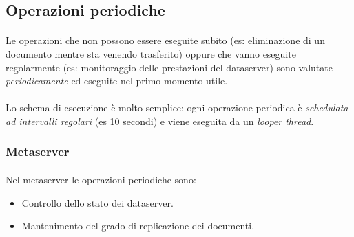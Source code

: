 \documentclass[11pt,a4paper,english]{article}
\begin{document}
\subsection{Operazioni periodiche}

\paragraph{} Le operazioni che non possono essere eseguite subito (es: eliminazione di un documento mentre sta venendo trasferito) oppure che vanno eseguite regolarmente (es: monitoraggio delle prestazioni del dataserver) sono valutate \emph{periodicamente} ed eseguite nel primo momento utile. 

\paragraph{} Lo schema di esecuzione è molto semplice: ogni operazione periodica è \emph{schedulata ad intervalli regolari} (es 10 secondi) e viene eseguita da un \emph{looper thread}.

\subsubsection{Metaserver}

\paragraph{} Nel metaserver le operazioni periodiche sono:\begin{itemize}
	\item Controllo dello stato dei dataserver.
	\item Mantenimento del grado di replicazione dei documenti.
\end{itemize}
\end{document}
